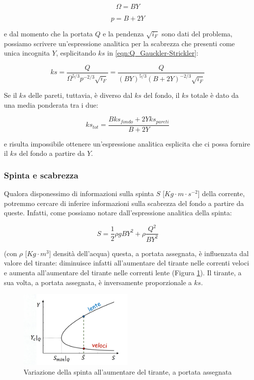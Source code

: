 \documentclass[12pt]{article} %
\begin{document}
\begin{equation}
    \Omega=BY
\end{equation}

\begin{equation}
    p=B+2Y
\end{equation}

\noindent e dal momento che la portata $Q$ e la pendenza $\sqrt{i_F}$ sono dati del problema, possiamo scrivere un'espressione analitica per la scabrezza che presenti come unica incognita $Y$, esplicitando $ks$ in \ref{eqn:Q_Gauckler-Strickler}:

\begin{equation}
    ks=\frac{Q}{\Omega^{5/3}p^{-2/3}\sqrt{i_F}}=\frac{Q}{(BY)^{5/3}(B+2Y)^{-2/3}\sqrt{i_F}}
\end{equation}

\noindent Se il $ks$ delle pareti, tuttavia, è diverso dal $ks$ del fondo, il $ks$ totale è dato da una media ponderata tra i due:

\begin{equation}
    ks_{tot} = \frac{Bks_{fondo} + 2Yks_{pareti}}{B+2Y}
\end{equation}

\noindent e risulta impossibile ottenere un'espressione analitica esplicita che ci possa fornire il $ks$ del fondo a partire da $Y$.

\subsubsection{Spinta e scabrezza}
\noindent Qualora disponessimo di informazioni sulla spinta $S$ [$Kg\cdot m\cdot s^{-2}$] della corrente, potremmo cercare di inferire informazioni sulla scabrezza del fondo a partire da queste. Infatti, come possiamo notare dall'espressione analitica della spinta:

\begin{equation}
    S=\frac{1}{2}\rho gBY^2+\rho\frac{Q^2}{BY^2}
    \label{eqn:S}
\end{equation}

\noindent (\noindent con $\rho$ [$Kg\cdot m^3$] densità dell'acqua) questa, a portata assegnata, è influenzata dal valore del tirante: diminuisce infatti all'aumentare del tirante nelle correnti veloci e aumenta all'aumentare del tirante nelle correnti lente (Figura \ref{fig:spinta}). Il tirante, a sua volta, a portata assegnata, è inversamente proporzionale a $ks$.

\begin{figure}
    \centering
    \includegraphics[width=0.5\textwidth]{Spinta.png}
    \caption{Variazione della spinta all'aumentare del tirante, a portata assegnata}
    \label{fig:spinta}
\end{figure}
\end{document}
